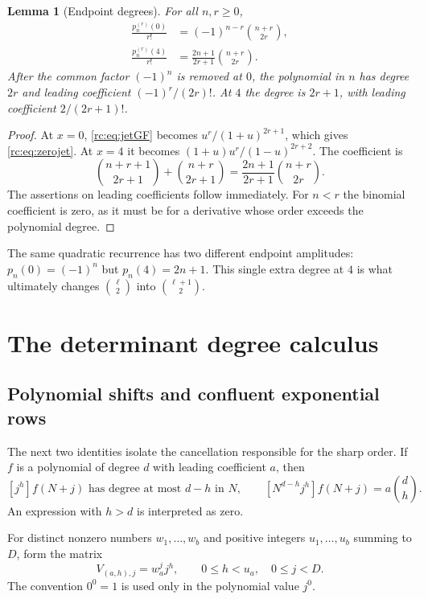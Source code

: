 \documentclass[11pt,a4paper]{article}
\numberwithin{equation}{section}
\newtheorem{lemma}[theorem]{Lemma}
\theoremstyle{definition}
\theoremstyle{remark}
\begin{document}
\begin{lemma}[Endpoint degrees]\label{rc:lem:endjets}
For all $n,r\ge0$,
\begin{align}
 \frac{p_n^{(r)}(0)}{r!}
   &=(-1)^{n-r}\binom{n+r}{2r},\label{rc:eq:zerojet}\\
 \frac{p_n^{(r)}(4)}{r!}
   &=\frac{2n+1}{2r+1}\binom{n+r}{2r}.\label{rc:eq:fourjet}
\end{align}
After the common factor $(-1)^n$ is removed at $0$, the polynomial
in $n$ has degree $2r$ and leading coefficient $(-1)^r/(2r)!$.
At $4$ the degree is $2r+1$, with leading coefficient $2/(2r+1)!$.
\end{lemma}
\begin{proof}
At $x=0$, \eqref{rc:eq:jetGF} becomes $u^r/(1+u)^{2r+1}$, which gives
\eqref{rc:eq:zerojet}.  At $x=4$ it becomes
$(1+u)u^r/(1-u)^{2r+2}$.  The coefficient is
\[
 \binom{n+r+1}{2r+1}+\binom{n+r}{2r+1}
   =\frac{2n+1}{2r+1}\binom{n+r}{2r}.
\]
The assertions on leading coefficients follow immediately.  For $n<r$
the binomial coefficient is zero, as it must be for a derivative whose
order exceeds the polynomial degree.
\end{proof}

The same quadratic recurrence has two different endpoint amplitudes:
$p_n(0)=(-1)^n$ but $p_n(4)=2n+1$.  This single extra degree at $4$ is
what ultimately changes $\binom\ell2$ into $\binom{\ell+1}2$.

\section{The determinant degree calculus}\label{rc:sec:degreecalculus}

\subsection{Polynomial shifts and confluent exponential rows}
The next two identities isolate the cancellation responsible for the
sharp order.  If $f$ is a polynomial of degree $d$ with leading
coefficient $a$, then
\begin{equation}\label{rc:eq:shiftcoeff}
 [j^h]f(N+j)\text{ has degree at most }d-h\text{ in }N,
 \qquad
 [N^{d-h}j^h]f(N+j)=a\binom dh.
\end{equation}
An expression with $h>d$ is interpreted as zero.

For distinct nonzero numbers $w_1,\ldots,w_b$ and positive integers
$u_1,\ldots,u_b$ summing to $D$, form the matrix
\[
 V_{(a,h),j}=w_a^j j^h,
 \qquad 0\le h<u_a,\quad 0\le j<D.
\]
The convention $0^0=1$ is used only in the polynomial value $j^0$.
\end{document}

